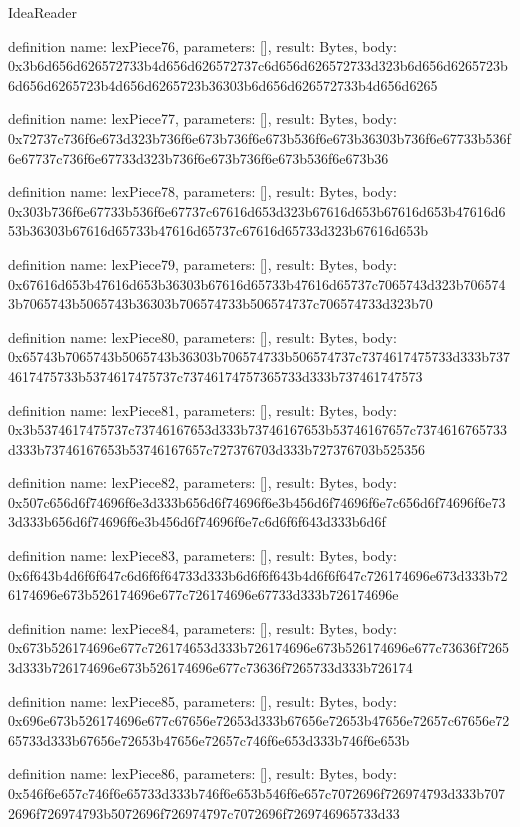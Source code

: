 \begin{lexlean}{IdeaReader}
\begin{semanticmodule}
definition{
  name: lexPiece76,
  parameters: [],
  result: Bytes,
  body: 0x3b6d656d626572733b4d656d626572737c6d656d626572733d323b6d656d6265723b6d656d6265723b4d656d6265723b36303b6d656d626572733b4d656d6265
}

definition{
  name: lexPiece77,
  parameters: [],
  result: Bytes,
  body: 0x72737c736f6e673d323b736f6e673b736f6e673b536f6e673b36303b736f6e67733b536f6e67737c736f6e67733d323b736f6e673b736f6e673b536f6e673b36
}

definition{
  name: lexPiece78,
  parameters: [],
  result: Bytes,
  body: 0x303b736f6e67733b536f6e67737c67616d653d323b67616d653b67616d653b47616d653b36303b67616d65733b47616d65737c67616d65733d323b67616d653b
}

definition{
  name: lexPiece79,
  parameters: [],
  result: Bytes,
  body: 0x67616d653b47616d653b36303b67616d65733b47616d65737c7065743d323b7065743b7065743b5065743b36303b706574733b506574737c706574733d323b70
}

definition{
  name: lexPiece80,
  parameters: [],
  result: Bytes,
  body: 0x65743b7065743b5065743b36303b706574733b506574737c7374617475733d333b7374617475733b5374617475737c73746174757365733d333b737461747573
}

definition{
  name: lexPiece81,
  parameters: [],
  result: Bytes,
  body: 0x3b5374617475737c73746167653d333b73746167653b53746167657c7374616765733d333b73746167653b53746167657c727376703d333b727376703b525356
}

definition{
  name: lexPiece82,
  parameters: [],
  result: Bytes,
  body: 0x507c656d6f74696f6e3d333b656d6f74696f6e3b456d6f74696f6e7c656d6f74696f6e733d333b656d6f74696f6e3b456d6f74696f6e7c6d6f6f643d333b6d6f
}

definition{
  name: lexPiece83,
  parameters: [],
  result: Bytes,
  body: 0x6f643b4d6f6f647c6d6f6f64733d333b6d6f6f643b4d6f6f647c726174696e673d333b726174696e673b526174696e677c726174696e67733d333b726174696e
}

definition{
  name: lexPiece84,
  parameters: [],
  result: Bytes,
  body: 0x673b526174696e677c726174653d333b726174696e673b526174696e677c73636f72653d333b726174696e673b526174696e677c73636f7265733d333b726174
}

definition{
  name: lexPiece85,
  parameters: [],
  result: Bytes,
  body: 0x696e673b526174696e677c67656e72653d333b67656e72653b47656e72657c67656e7265733d333b67656e72653b47656e72657c746f6e653d333b746f6e653b
}

definition{
  name: lexPiece86,
  parameters: [],
  result: Bytes,
  body: 0x546f6e657c746f6e65733d333b746f6e653b546f6e657c7072696f726974793d333b7072696f726974793b5072696f726974797c7072696f7269746965733d33
}


\end{semanticmodule}
\end{lexlean}

